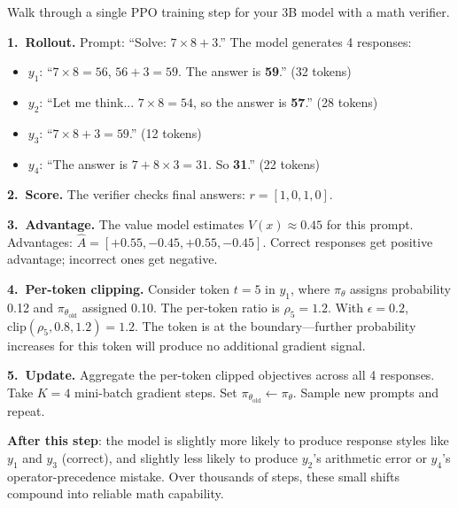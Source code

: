\noindent{}

\begin{tcolorbox}[colback=blue!5, colframe=blue!40, title=\textbf{Worked Example: One PPO Step on Math}]
Walk through a single PPO training step for your 3B model with a math verifier.

\textbf{1.~Rollout.} Prompt: ``Solve: $7 \times 8 + 3$.'' The model generates 4 responses:
\begin{itemize}[nosep]
  \item $y_1$: ``$7 \times 8 = 56$, $56 + 3 = 59$. The answer is \textbf{59}.'' (32 tokens)
  \item $y_2$: ``Let me think... $7 \times 8 = 54$, so the answer is \textbf{57}.'' (28 tokens)
  \item $y_3$: ``$7 \times 8 + 3 = 59$.'' (12 tokens)
  \item $y_4$: ``The answer is $7 + 8 \times 3 = 31$. So \textbf{31}.'' (22 tokens)
\end{itemize}

\textbf{2.~Score.} The verifier checks final answers: $r = [1, 0, 1, 0]$.

\textbf{3.~Advantage.} The value model estimates $V(x) \approx 0.45$ for this prompt. Advantages: $\hat{A} = [+0.55, -0.45, +0.55, -0.45]$. Correct responses get positive advantage; incorrect ones get negative.

\textbf{4.~Per-token clipping.} Consider token $t{=}5$ in $y_1$, where $\pi_\theta$ assigns probability 0.12 and $\pi_{\theta_\text{old}}$ assigned 0.10. The per-token ratio is $\rho_5 = 1.2$. With $\epsilon = 0.2$, $\text{clip}(\rho_5, 0.8, 1.2) = 1.2$. The token is at the boundary---further probability increases for this token will produce no additional gradient signal.

\textbf{5.~Update.} Aggregate the per-token clipped objectives across all 4 responses. Take $K{=}4$ mini-batch gradient steps. Set $\pi_{\theta_\text{old}} \leftarrow \pi_\theta$. Sample new prompts and repeat.

\textbf{After this step}: the model is slightly more likely to produce response styles like $y_1$ and $y_3$ (correct), and slightly less likely to produce $y_2$'s arithmetic error or $y_4$'s operator-precedence mistake. Over thousands of steps, these small shifts compound into reliable math capability.
\end{tcolorbox}

